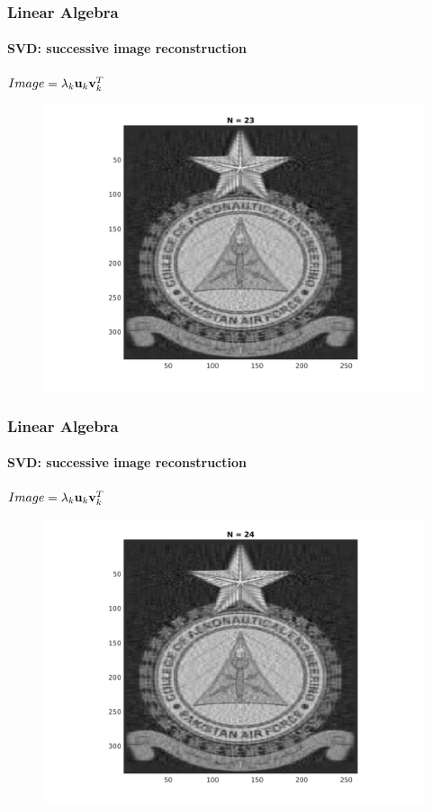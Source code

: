 \documentclass[hyperref={pdfpagelabels=true}]{beamer}
\begin{document}
\begin{frame}
\frametitle{Linear Algebra}
\framesubtitle{SVD: successive image reconstruction} 
\small{
\begin{center}
$Image = \lambda_k{\bf u}_k {\bf v}_k^T$
\end{center}}
\begin{figure}[!htb]
\centering
\includegraphics [scale=0.48]{n/b23.png}
\end{figure}
\end{frame}


\begin{frame}
\frametitle{Linear Algebra}
\framesubtitle{SVD: successive image reconstruction} 
\small{
\begin{center}
$Image = \lambda_k{\bf u}_k {\bf v}_k^T$
\end{center}}
\begin{figure}[!htb]
\centering
\includegraphics [scale=0.48]{n/b24.png}
\end{figure}
\end{frame}
\end{document}
